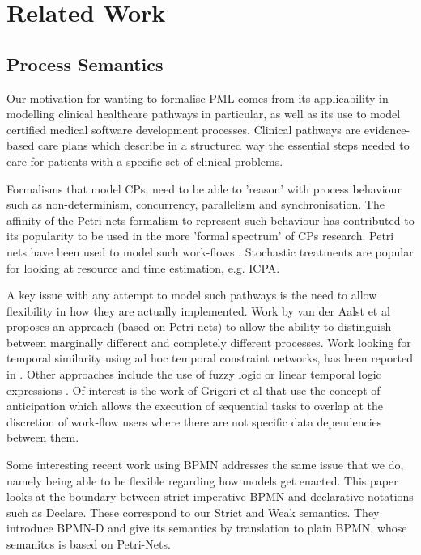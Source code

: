 \section{Related Work}\label{ha:related}


\subsection{Process Semantics}

Our motivation for wanting to formalise PML
comes from its applicability in modelling clinical healthcare pathways
\cite{Campbell98}
in particular,
as well as its use to model certified medical software development processes.
Clinical pathways are evidence-based care plans which describe in a
structured way the essential steps needed to care for patients with a
specific set of clinical problems.





Formalisms that model CPs, need to be able to 'reason' with process behaviour
such as non-determinism, concurrency, parallelism and synchronisation. The
affinity of the Petri nets formalism to represent such behaviour has
contributed to its popularity to be used in the more 'formal spectrum' of CPs
research. Petri nets have been used to model such work-flows
\cite{Ellis95,vanderAalst96,Eshuis03}.
Stochastic treatments are popular
for looking at resource and time estimation, e.g. ICPA\cite{Yang12}.

A key issue with any attempt to model such pathways is the need
to allow flexibility in how they are actually implemented.
Work by van der Aalst et al \cite{vanderAalst06} proposes an approach (based on Petri
nets) to allow the ability to distinguish between
 marginally different and completely different processes.
Work looking for temporal similarity
using ad hoc temporal constraint networks,
has been reported in \cite{Combi09}.
Other approaches include the use of fuzzy logic \cite{Adam05}
or linear temporal logic expressions \cite{Pesic06}.
Of interest is the work of Grigori et al \cite{Grigori01}
that use the concept of anticipation which allows
the execution of sequential tasks to overlap at the discretion of work-flow
users where there are not specific data dependencies between them.

Some interesting recent work using BPMN\cite{DBLP:conf/caise/GiacomoDMM15}
addresses the same issue that we do,
namely being able to be flexible regarding how models get enacted.
This paper looks at the boundary between strict imperative BPMN
and declarative notations such as Declare\cite{DBLP:conf/edoc/PesicSA07}.
These correspond to our Strict and Weak semantics.
They introduce BPMN-D and give its semantics by translation
to plain BPMN, whose semanitcs is based on Petri-Nets\cite{DBLP:journals/infsof/DijkmanDO08}.


